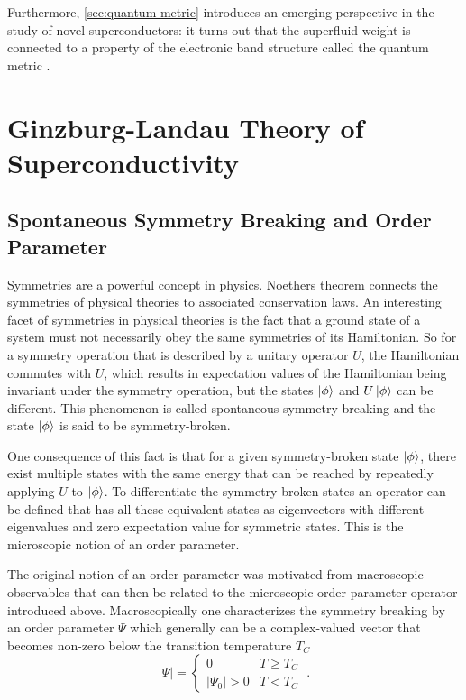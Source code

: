 \documentclass[../notes.tex]{subfiles}
\begin{document}
Furthermore, \cref{sec:quantum-metric} introduces an emerging perspective in the study of novel superconductors: it turns out that the superfluid weight is connected to a property of the electronic band structure called the quantum metric \cite{peottaSuperfluidityTopologicallyNontrivial2015, yuQuantumGeometryQuantum2024}.

\section{Ginzburg-Landau Theory of Superconductivity}\label{sec:Ginzburg-Landau theory of superconductivity}

\subsection*{Spontaneous Symmetry Breaking and Order Parameter}

Symmetries are a powerful concept in physics.
Noethers theorem \cite{noetherInvarianteVariationsprobleme1918} connects the symmetries of physical theories to associated conservation laws.
An interesting facet of symmetries in physical theories is the fact that a ground state of a system must not necessarily obey the same symmetries of its Hamiltonian.
So for a symmetry operation that is described by a unitary operator \(U\), the Hamiltonian commutes with \(U\), which results in expectation values of the Hamiltonian being invariant under the symmetry operation, but the states \(\ket{\phi}\) and \(U \ket{\phi}\) can be different.
This phenomenon is called spontaneous symmetry breaking and the state \(\ket{\phi}\) is said to be symmetry-broken.

One consequence of this fact is that for a given symmetry-broken state \(\ket{\phi}\), there exist multiple states with the same energy that can be reached by repeatedly applying \(U\) to \(\ket{\phi}\).
To differentiate the symmetry-broken states an operator can be defined that has all these equivalent states as eigenvectors with different eigenvalues and zero expectation value for symmetric states.
This is the microscopic notion of an order parameter.

The original notion of an order parameter was motivated from macroscopic observables that can then be related to the microscopic order parameter operator introduced above.
Macroscopically one characterizes the symmetry breaking by an order parameter \(\Psi\) which generally can be a complex-valued vector that becomes non-zero below the transition temperature \(T_C\)
\begin{equation}
	\vert \Psi \vert =
	\begin{cases}
		0 & T \geq T_C \\
		\vert \Psi_0 \vert > 0 & T < T_C
	\end{cases} \;.
\end{equation}
\end{document}
